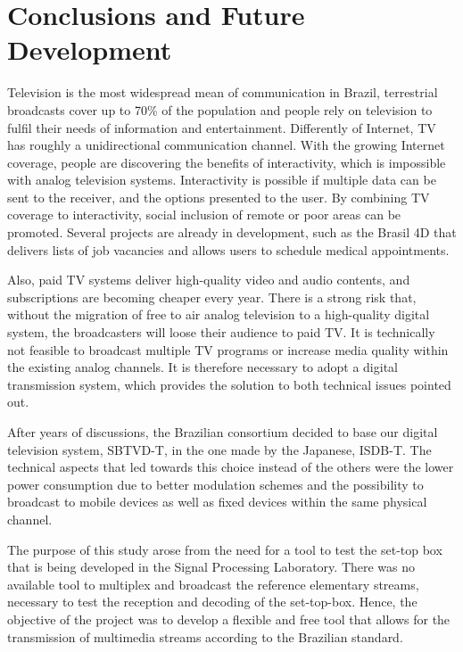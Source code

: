 \documentclass[
	12pt,				%
	openright,			%
	twoside,			%
	a4paper,			%
	brazil,
	french,				%
	english
	]{abntex2}
\begin{document}
\chapter[Conclusions and Future Development]{Conclusions and Future Development}


Television is the most widespread mean of communication in Brazil, terrestrial broadcasts cover up to 70\% of the population and people rely on television to fulfil their needs of information and entertainment. Differently of Internet, TV has roughly a unidirectional communication channel. With the growing Internet coverage, people are discovering the benefits of interactivity, which is impossible with analog television systems. Interactivity is possible if multiple data can be sent to the receiver, and the options presented to the user. By combining TV coverage to interactivity, social inclusion of remote or poor areas can be promoted. Several projects are already in development, such as the Brasil 4D that delivers lists of job vacancies and allows users to schedule medical appointments.

Also, paid TV systems deliver high-quality video and audio contents, and subscriptions are becoming cheaper every year. There is a strong risk that, without the migration of free to air analog television to a high-quality digital system, the broadcasters will loose their audience to paid TV. It is technically not feasible to broadcast multiple TV programs or increase media quality within the existing analog channels. It is therefore necessary to adopt a digital transmission system, which provides the solution to both technical issues pointed out.

After years of discussions, the Brazilian consortium decided to base our digital television system, SBTVD-T, in the one made by the Japanese, ISDB-T. The technical aspects that led towards this choice instead of the others were the lower power consumption due to better modulation schemes and the possibility to broadcast to mobile devices as well as fixed devices within the same physical channel.


The purpose of this study arose from the need for a tool to test the set-top box that is being developed in the Signal Processing Laboratory. There was no available tool to multiplex and broadcast the reference elementary streams, necessary to test the reception and decoding of the set-top-box. Hence, the objective of the project was to develop a flexible and free tool that allows for the transmission of multimedia streams according to the Brazilian standard.
\end{document}
